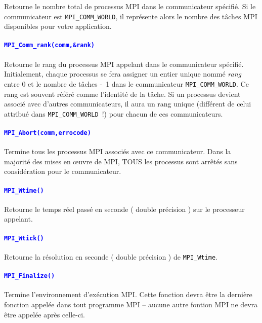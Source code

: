 \documentclass[11pt,a4paper]{article}
\begin{document}
  Retourne le nombre total de processus MPI dans le communicateur spécifié.
  Si le communicateur est \texttt{MPI\_COMM\_WORLD}, il représente alors le nombre des tâches MPI disponibles pour votre application.

\paragraph{\textcolor{blue}{\texttt{MPI\_Comm\_rank(comm,\&rank)}}}

  Retourne le rang du processus MPI appelant dans le communicateur spécifié. Initialement, chaque processus se fera
  assigner un entier unique nommé \textsl{rang} entre 0 et le nombre de tâches
  -\ 1 dans le communicateur
  \texttt{MPI\_COMM\_WORLD}. Ce rang est souvent référé comme l'identité de la tâche. Si un processus devient
  associé avec d'autres communicateurs, il aura un rang unique (différent de celui attribué dans
  \texttt{MPI\_COMM\_WORLD}\ !) pour chacun de ces communicateurs.

\paragraph{\textcolor{blue}{\texttt{MPI\_Abort(comm,errocode)}}}

  Termine tous les processus MPI associés avec ce communicateur. Dans la majorité des mises en {\oe}uvre de MPI,
  TOUS les processus sont arrêtés sans considération pour le communicateur.

\paragraph{\textcolor{blue}{\texttt{MPI\_Wtime()}}}

  Retourne le temps réel passé en seconde ( double précision ) sur le processeur appelant.

\paragraph{\textcolor{blue}{\texttt{MPI\_Wtick()}}}

  Retourne la résolution en seconde ( double précision ) de \texttt{MPI\_Wtime}.

\paragraph{\textcolor{blue}{\texttt{MPI\_Finalize()}}}

  Termine l'environnement d'exécution MPI. Cette fonction devra être la dernière fonction appelée dans tout programme MPI -- aucune autre fontion MPI ne devra être appelée après celle-ci.
\end{document}
